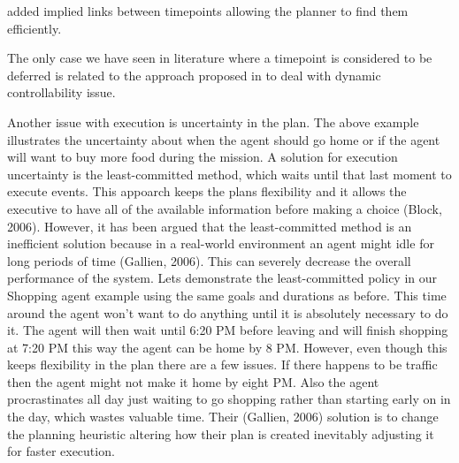 
  \cite{mus97} added
implied links between timepoints allowing the planner to find them
efficiently.

The only case we have seen in literature where a timepoint is
considered to be deferred is related to the approach proposed in 
\cite{morris01} to deal with dynamic controllability issue. 

Another issue with execution is uncertainty in the plan. The above
example illustrates the uncertainty about when the agent should go home
or if the agent will want to buy more food during the mission. A
solution for execution uncertainty is the least-committed method, which
waits until that last moment to execute events. This appoarch keeps the
plans flexibility and it allows the executive to have all of the
available information before making a choice (Block, 2006). However, it
has been argued that the least-committed method is an inefficient
solution because in a real-world environment an agent might idle for
long periods of time (Gallien, 2006). This can severely decrease the
overall performance of the system. Lets demonstrate the least-committed
policy in our Shopping agent example using the same goals and durations
as before. This time around the agent won't want to do anything until it
is absolutely necessary to do it. The agent will then wait until 6:20 PM
before leaving and will finish shopping at 7:20 PM this way the agent
can be home by 8 PM. However, even though this keeps flexibility in the
plan there are a few issues. If there happens to be traffic then the
agent might not make it home by eight PM. Also the agent procrastinates
all day just waiting to go shopping rather than starting early on in the
day, which wastes valuable time. Their (Gallien, 2006) solution is to
change the planning heuristic altering how their plan is created
inevitably adjusting it for faster execution.

